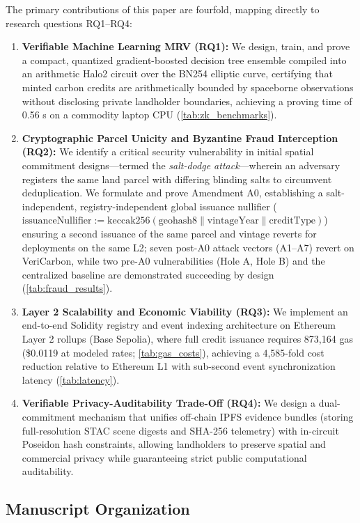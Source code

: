 \documentclass[preprint,12pt]{elsarticle}
\begin{document}
The primary contributions of this paper are fourfold, mapping directly to research questions RQ1–RQ4:
\begin{enumerate}
\item \textbf{Verifiable Machine Learning MRV (RQ1):} We design, train, and prove a compact, quantized gradient-boosted decision tree ensemble compiled into an arithmetic Halo2 circuit over the BN254 elliptic curve, certifying that minted carbon credits are arithmetically bounded by spaceborne observations without disclosing private landholder boundaries, achieving a proving time of 0.56 s on a commodity laptop CPU (\autoref{tab:zk_benchmarks}).
\item \textbf{Cryptographic Parcel Unicity and Byzantine Fraud Interception (RQ2):} We identify a critical security vulnerability in initial spatial commitment designs—termed the \textit{salt-dodge attack}—wherein an adversary registers the same land parcel with differing blinding salts to circumvent deduplication. We formulate and prove Amendment A0, establishing a salt-independent, registry-independent global issuance nullifier ($\text{issuanceNullifier} := \text{keccak256}(\text{geohash8} \parallel \text{vintageYear} \parallel \text{creditType})$) ensuring a second issuance of the same parcel and vintage reverts for deployments on the same L2; seven post-A0 attack vectors (A1–A7) revert on VeriCarbon, while two pre-A0 vulnerabilities (Hole A, Hole B) and the centralized baseline are demonstrated succeeding by design (\autoref{tab:fraud_results}).
\item \textbf{Layer 2 Scalability and Economic Viability (RQ3):} We implement an end-to-end Solidity registry and event indexing architecture on Ethereum Layer 2 rollups (Base Sepolia), where full credit issuance requires 873,164 gas (\$0.0119 at modeled rates; \autoref{tab:gas_costs}), achieving a 4,585-fold cost reduction relative to Ethereum L1 with sub-second event synchronization latency (\autoref{tab:latency}).
\item \textbf{Verifiable Privacy-Auditability Trade-Off (RQ4):} We design a dual-commitment mechanism that unifies off-chain IPFS evidence bundles (storing full-resolution STAC scene digests and SHA-256 telemetry) with in-circuit Poseidon hash constraints, allowing landholders to preserve spatial and commercial privacy while guaranteeing strict public computational auditability.
\end{enumerate}

\subsection{Manuscript Organization}
\end{document}
